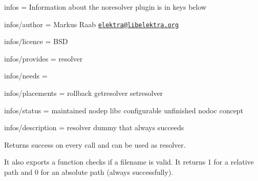 
\begin{DoxyItemize}
\item infos = Information about the noresolver plugin is in keys below
\item infos/author = Markus Raab \href{mailto:elektra@libelektra.org}{\tt elektra@libelektra.\+org}
\item infos/licence = B\+S\+D
\item infos/provides = resolver
\item infos/needs =
\item infos/placements = rollback getresolver setresolver
\item infos/status = maintained nodep libc configurable unfinished nodoc concept
\item infos/description = resolver dummy that always succeeds
\end{DoxyItemize}

Returns success on every call and can be used as resolver.

It also exports a function checks if a filename is valid. It returns 1 for a relative path and 0 for an absolute path (always successfully). 